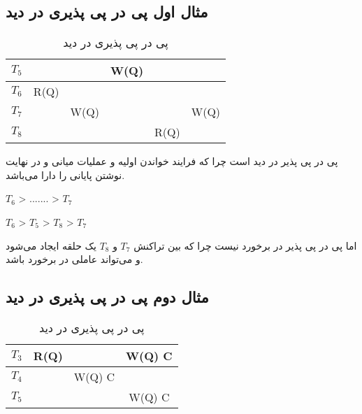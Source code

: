 \documentclass[a4paper]{article}
\begin{document}
\subsection{مثال اول پی در پی پذیری در دید}

\begin{LTR}
    \begin{table}[h]
        \centering
        \begin{RTL}
            \caption{پی در پی پذیری در دید}
        \end{RTL}
        \begin{tabular}{c|c|c|c|c|c}
            $T_{5}$ & & & W(Q) & & \\ \hline
            $T_{6}$ & R(Q) & & & &  \\ \hline
            $T_{7}$ & & W(Q) & & & W(Q) \\ \hline
            $T_{8}$ & & & & R(Q) & \\
        \end{tabular}
    \end{table}
\end{LTR}

پی در پی پذیر در دید است چرا که فرایند خواندن اولیه و عملیات میانی و در نهایت
نوشتن پایانی را دارا می‌باشد.

\begin{LTR}
    $T_{6}$ > ....... > $T_{7}$

    $T_{6}$ > $T_{5}$ > $T_{8}$ > $T_{7}$
\end{LTR}

اما پی در پی پذیر در برخورد نیست چرا که بین تراکنش $T_{7}$ و $T_{8}$ یک حلقه
ایجاد می‌شود و می‌تواند عاملی در برخورد باشد.

\newpage

\subsection{مثال دوم پی در پی پذیری در دید}

\begin{LTR}
    \begin{table}[h]
        \centering
        \begin{RTL}
            \caption{پی در پی پذیری در دید}
        \end{RTL}
        \begin{tabular}{c|c|c|c}
            $T_{3}$ & R(Q) & & W(Q) C \\ \hline
            $T_{4}$ & & W(Q) C &  \\ \hline
            $T_{5}$ & & & W(Q) C \\
        \end{tabular}
    \end{table}
\end{LTR}
\end{document}
